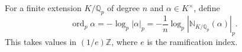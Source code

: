 For a finite extension $K/\mathbb{Q}_p$ of degree $n$ and $\alpha \in K^\times$, define $$\operatorname{ord}_p \alpha = -\log_p |\alpha|_p = -\frac{1}{n}\log_p |\mathbb{N}_{K/\mathbb{Q}_p}(\alpha)|_p.$$ This takes values in $(1/e)\mathbb{Z}$, where $e$ is the ramification index.